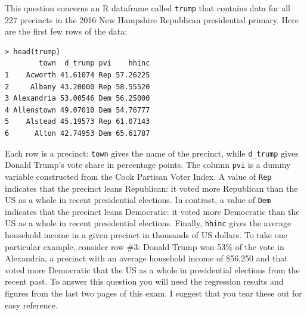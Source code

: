\documentclass[addpoints,12pt]{exam}
\begin{document}
\begin{questions}
\question This question concerns an R dataframe called \texttt{trump} that contains data for all 227 precincts in the 2016 New Hampshire Republican presidential primary.
Here are the first few rows of the data:
\begin{verbatim}
> head(trump)
        town  d_trump pvi    hhinc
1    Acworth 41.61074 Rep 57.26225
2     Albany 43.20000 Rep 58.55520
3 Alexandria 53.00546 Dem 56.25000
4 Allenstown 49.07010 Dem 54.76777
5    Alstead 45.19573 Rep 61.07143
6      Alton 42.74953 Dem 65.61787
\end{verbatim}
Each row is a precinct: \texttt{town} gives the name of the precinct, while \texttt{d\_trump} gives Donald Trump's vote share in percentage points.
The column \texttt{pvi} is a dummy variable constructed from the Cook Partisan Voter Index.
A value of \texttt{Rep} indicates that the precinct leans Republican: it voted more Republican than the US as a whole in recent presidential elections.
In contrast, a value of \texttt{Dem} indicates that the precinct leans Democratic: it voted more Democratic than the US as a whole in recent presidential elections.
Finally, \texttt{hhinc} gives the average household income in a given precinct in thousands of US dollars.
To take one particular example, consider row \#3: Donald Trump won 53\% of the vote in Alexandria, a precinct with an average household income of \$56,250 and that voted more Democratic that the US as a whole in presidential elections from the recent past.
To answer this question you will need the regression results and figures from the last two pages of this exam.
I suggest that you tear these out for easy reference.
\end{questions}
\end{document}
